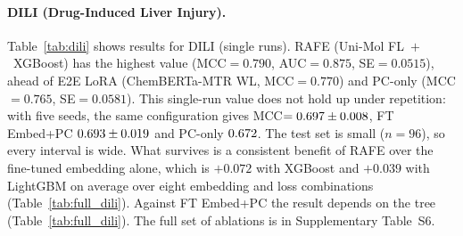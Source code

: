 \documentclass[pdflatex,sn-mathphys-num]{sn-jnl}%
\begin{document}
\paragraph{DILI (Drug-Induced Liver Injury).} Table~\ref{tab:dili} shows results for DILI (single runs). RAFE (Uni-Mol FL~$+$~XGBoost) has the highest value (MCC$=0.790$, AUC$=0.875$, SE$=0.0515$), ahead of E2E LoRA (ChemBERTa-MTR WL, MCC$=0.770$) and PC-only (MCC$=0.765$, SE$=0.0581$). This single-run value does not hold up under repetition: with five seeds, the same configuration gives MCC$=0.697 \pm 0.008$, FT Embed+PC $0.693 \pm 0.019$ and PC-only $0.672$. The test set is small ($n=96$), so every interval is wide. What survives is a consistent benefit of RAFE over the fine-tuned embedding alone, which is $+0.072$ with XGBoost and $+0.039$ with LightGBM on average over eight embedding and loss combinations (Table~\ref{tab:full_dili}). Against FT Embed+PC the result depends on the tree (Table~\ref{tab:full_dili}). The full set of ablations is in Supplementary Table~S6.

\begin{table}[!ht]
\centering
\caption{Best configurations on DILI (binary, drug-induced liver injury, TDC ADMET Group).}
\label{tab:dili}
\end{table}
\end{document}
